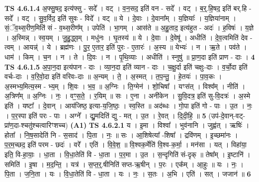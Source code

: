 \documentclass[17pt]{extarticle}
\begin{document}
                                \textbf{ TS 4.6.1.4} \newline
                  अ॒फ्सु॒षद॒ इत्य॑फ्सु - सदे᳚ । वट् । व॒न॒सद॒ इति॑ वन - सदे᳚ । वट् । ब॒र्॒.हि॒षद॒ इति॑ बर्.हि - सदे᳚ । वट् । सु॒व॒र्विद॒ इति॑ सुवः - विदे᳚ । वट् ॥ ये । दे॒वाः । दे॒वाना᳚म् । य॒ज्ञियाः᳚ । य॒ज्ञिया॑नाम् । सं॒ॅव॒थ्स॒रीण॒मिति॑ सं - व॒थ्स॒रीण᳚म् । उपेति॑ । भा॒गम् । आस॑ते ॥ अ॒हु॒ताद॒ इत्य॑हुत - अदः॑ । ह॒विषः॑ । य॒ज्ञे । अ॒स्मिन्न् । स्व॒यम् । जु॒हु॒द्ध्व॒म् । मधु॑नः । घृ॒तस्य॑ ॥ ये । दे॒वाः । दे॒वेषू॑ । अधीति॑ । दे॒व॒त्वमिति॑ देव - त्वम् । आयन्न्॑ । ये । ब्रह्म॑णः । पु॒र॒ ए॒तार॒ इति॑ पुरः - ए॒तारः॑ । अ॒स्य ॥ येभ्यः॑ । न । ऋ॒ते । पव॑ते । धाम॑ । किम् । च॒न । न । ते । दि॒वः । न । पृ॒थि॒व्याः । अधीति॑ । स्नुषु॑ ॥ प्रा॒ण॒दा इति॑ प्राण - दाः । \textbf{  4} \newline
                  \newline
                                \textbf{ TS 4.6.1.5} \newline
                  अ॒पा॒न॒दा इत्य॑पान - दाः । व्या॒न॒दा इति॑ व्यान - दाः । च॒क्षु॒र्दा इति॑ चक्षुः-दाः । व॒र्चो॒दा इति॑ वर्चः-दाः । व॒रि॒वो॒दा इति॑ वरिवः-दाः ॥ अ॒न्यम् । ते॒ । अ॒स्मत् । त॒प॒न्तु॒ । हे॒तयः॑ । पा॒व॒कः । अ॒स्मभ्य॒मित्य॒स्म - भ्य॒म् । शि॒वः । भ॒व॒ ॥ अ॒ग्निः । ति॒ग्मेन॑ । शो॒चिषा᳚ । यꣳस॑त् । विश्व᳚म् । नीति॑ । अ॒त्रिण᳚म् ॥ अ॒ग्निः । नः॒ । वꣳ॒॒स॒ते॒ । र॒यिम् ॥ सः । ए॒ना । अनी॑केन । सु॒वि॒दत्र॒ इति॑ सु-वि॒दत्रः॑ । अ॒स्मे इति॑ । यष्टा᳚ । दे॒वान् । आय॑जिष्ठ॒ इत्या-य॒जि॒ष्ठः॒ । स्व॒स्ति ॥ अद॑ब्धः । गो॒पा इति॑ गो - पाः । उ॒त । नः॒ । प॒र॒स्पा इति॑ परः - पाः । अग्ने᳚ । द्यु॒मदिति॑ द्यु - मत् । उ॒त । रे॒वत् । दि॒दी॒हि॒ ॥ \textbf{  5} \newline
                  \newline
                      (उप॑-दे॒वान्-वट्-प्रा॑ण॒दा-श्चतु॑श्चत्वारिꣳशच्च)  \textbf{(A1)} \newline \newline
                                \textbf{ TS 4.6.2.1} \newline
                  य । इ॒मा । विश्वा᳚ । भुव॑नानि । जुह्व॑त् । ऋषिः॑ । होता᳚ । नि॒ष॒सादेति॑ नि - स॒साद॑ । पि॒ता । नः॒ ॥ सः । आ॒शिषेत्या᳚ -शिषा᳚ । द्रवि॑णम् । इ॒च्छमा॑नः । प॒र॒म॒च्छद॒ इति॑ परम - छदः॑ । वरे᳚ । एति॑ । वि॒वे॒श॒ ॥ वि॒श्वक॒र्मेति॑ वि॒श्व-क॒र्मा॒ । मन॑सा । यत् । विहा॑या॒ इति॒ वि-हा॒याः॒ । धा॒ता । वि॒धा॒तेति॑ वि - धा॒ता । प॒र॒मा । उ॒त । स॒न्दृगिति॑ सं-दृक् ॥ तेषा᳚म् । इ॒ष्टानि॑ । समिति॑ । इ॒षा । म॒द॒न्ति॒ । यत्र॑ । स॒प्त॒र्॒.षीनिति॑ सप्त-ऋ॒षीन् । प॒रः । एक᳚म् । आ॒हुः ॥ यः । नः॒ । पि॒ता । ज॒नि॒ता । यः । वि॒धा॒तेति॑ वि - धा॒ता । यः । नः॒ । स॒तः । अ॒भि । एति॑ । सत् । जजान॑ ॥ \textbf{  6} \newline
\end{document}
